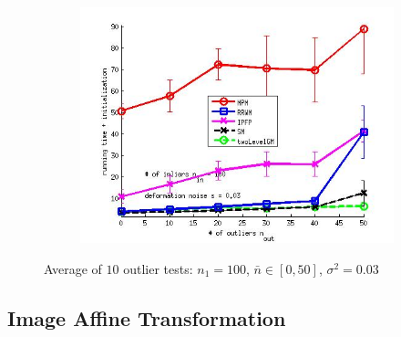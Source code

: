 \begin{figure}[h]
\begin{subfigure}[b]{0.3\textwidth}
		\includegraphics[scale=0.25]{"chapter3/fig/SyntheticTest/ver4.3.2/outliertest_n50/time_summary_avg10t"} 
	\end{subfigure} 	
	\caption{Average of $10$ outlier tests: $n_1=100$, $\bar{n}\in[0,50]$, $\sigma^2=0.03$}
	\label{fig:syntest3_ver432}
\end{figure}
\FloatBarrier

\subsection{Image Affine Transformation}

